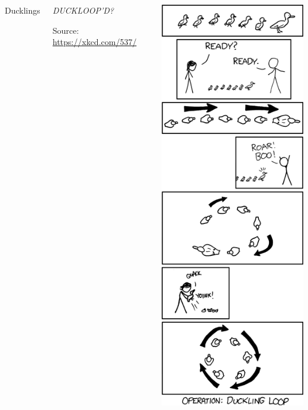 
\begin{frame}%
%
\begin{columns}[T]
\begin{Large}
	{Ducklings}
\end{Large}
%
\begin{center}
	\vspace{60pt}
	\emph{DUCKLOOP'D?}

	\vspace{6pt}
	Source: \url{https://xkcd.com/537/}
\end{center}
%
\begin{center}
	\includegraphics[width=.38\linewidth]{./gfx/xkcd-ducklings}\\
\end{center}
\end{columns}

%
\end{frame}


